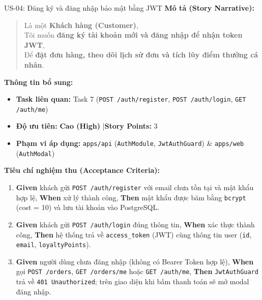 \documentclass[12pt,a4paper]{article}
\begin{document}
\begin{userstorybox}{US-04: Đăng ký và đăng nhập bảo mật bằng JWT}
    \textbf{Mô tả (Story Narrative):}
    \begin{quote}
        Là một \textbf{Khách hàng (Customer)},\\
        Tôi muốn \textbf{đăng ký tài khoản mới và đăng nhập để nhận token JWT},\\
        Để \textbf{đặt đơn hàng, theo dõi lịch sử đơn và tích lũy điểm thưởng cá nhân}.
    \end{quote}

    \textbf{Thông tin bổ sung:}
    \begin{itemize}[noitemsep]
        \item \textbf{Task liên quan:} Task 7 (\texttt{POST /auth/register}, \texttt{POST /auth/login}, \texttt{GET /auth/me})
        \item \textbf{Độ ưu tiên:} \textcolor{taghigh}{\textbf{Cao (High)}} \quad|\quad \textbf{Story Points:} 3
        \item \textbf{Phạm vi áp dụng:} \texttt{apps/api} (\texttt{AuthModule}, \texttt{JwtAuthGuard}) \& \texttt{apps/web} (\texttt{AuthModal})
    \end{itemize}

    \textbf{Tiêu chí nghiệm thu (Acceptance Criteria):}
    \begin{enumerate}[noitemsep]
        \item \textbf{Given} khách gửi \texttt{POST /auth/register} với email chưa tồn tại và mật khẩu hợp lệ, \textbf{When} xử lý thành công, \textbf{Then} mật khẩu được băm bằng \texttt{bcrypt} (cost = 10) và lưu tài khoản vào PostgreSQL.
        \item \textbf{Given} khách gửi \texttt{POST /auth/login} đúng thông tin, \textbf{When} xác thực thành công, \textbf{Then} hệ thống trả về \texttt{access\_token} (JWT) cùng thông tin user (\texttt{id}, \texttt{email}, \texttt{loyaltyPoints}).
        \item \textbf{Given} người dùng chưa đăng nhập (không có Bearer Token hợp lệ), \textbf{When} gọi \texttt{POST /orders}, \texttt{GET /orders/me} hoặc \texttt{GET /auth/me}, \textbf{Then} \texttt{JwtAuthGuard} trả về \texttt{401 Unauthorized}; trên giao diện khi bấm thanh toán sẽ mở modal đăng nhập.
    \end{enumerate}
\end{userstorybox}

\newpage

\end{document}
